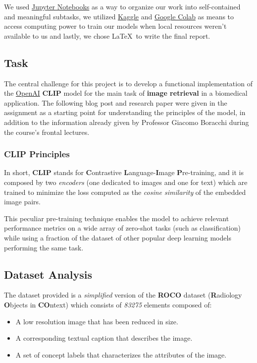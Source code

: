 \documentclass[10pt,twocolumn,letterpaper]{article}
\begin{document}
We used \href{https://jupyter.org/}{Jupyter Notebooks} as a way to organize our work into self-contained and meaningful subtasks, we utilized \href{https://www.kaggle.com/}{Kaggle} and \href{https://colab.research.google.com}{Google Colab} as means to access computing power to train our models when local resources weren't available to us and lastly, we chose \LaTeX~to write the final report.

\subsection{Task}
The central challenge for this project is to develop a functional implementation of the \href{https://openai.com/}{OpenAI} \textbf{CLIP} model for the main task of \textbf{image retrieval} in a biomedical application.
The following blog post \cite{clip_blog} and research paper \cite{clip_paper} were given in the assignment as a starting point for understanding the principles of the model, in addition to the information already given by Professor Giacomo Boracchi during the course's frontal lectures.

\subsubsection*{CLIP Principles}
In short, \textbf{CLIP} stands for \textbf{C}ontrastive \textbf{L}anguage-\textbf{I}mage \textbf{P}re-training, and it is composed by two \textit{encoders} (one dedicated to images and one for text) which are trained to minimize the loss computed as the \textit{cosine similarity} of the embedded image pairs.

This peculiar pre-training technique enables the model to achieve relevant performance metrics on a wide array of zero-shot tasks (such as classification) while using a fraction of the dataset of other popular deep learning models performing the same task.

\subsection{Dataset Analysis}

The dataset provided is a \textit{simplified} version of the \textbf{ROCO} dataset (\textbf{R}adiology \textbf{O}bjects in \textbf{CO}ntext) \cite{roco} which consists of \textit{83275} elements composed of:

\begin{itemize}
   \item A low resolution image that has been reduced in size.
   \item A corresponding textual caption that describes the image.
   \item A set of concept labels that characterizes the attributes of the image.
\end{itemize}
\end{document}
